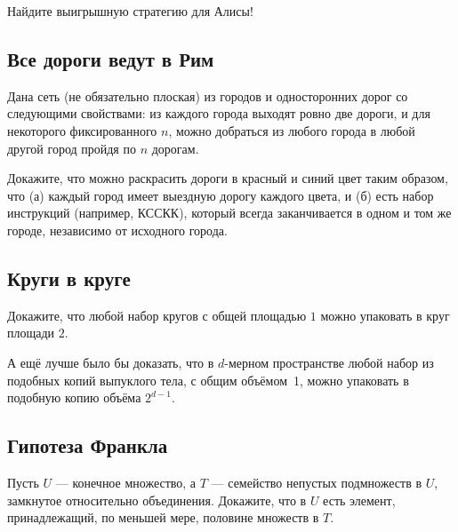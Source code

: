 Найдите выигрышную стратегию для Алисы!

\subsection*{Все дороги ведут в Рим}

Дана сеть (не обязательно плоская) из городов и односторонних дорог со следующими свойствами:
из каждого города выходят ровно две дороги, и для некоторого фиксированного $n$, можно добраться из любого города в любой другой город пройдя по $n$ дорогам.

Докажите, что можно раскрасить дороги в красный и синий цвет таким образом, что (а) каждый город имеет выездную дорогу каждого цвета, и (б) есть набор инструкций (например, КССКК), который всегда заканчивается в одном и том же городе, независимо от исходного города.

\subsection*{Круги в круге}

Докажите, что любой набор кругов с общей площадью $1$ можно упаковать в круг площади $2$.

А ещё лучше было бы доказать, что в $d$-мерном пространстве любой набор из подобных копий выпуклого тела, с общим объёмом~1, можно упаковать в подобную копию объёма $2^{d-1}$.

\subsection*{Гипотеза Франкла}

Пусть $U$ --- конечное множество, а $T$ --- семейство непустых подмножеств в $U$, замкнутое относительно объединения.
Докажите, что в $U$ есть элемент, принадлежащий, по меньшей мере, половине множеств в $T$.

